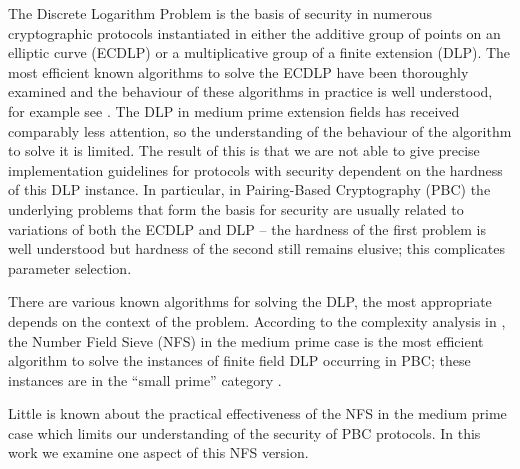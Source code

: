 \documentclass[a4paper, 10pt, envcountsect, runningheads]{article}
\numberwithin{figure}{section}
\numberwithin{equation}{section}
\begin{document}
The Discrete Logarithm Problem is the basis of security in numerous cryptographic protocols instantiated in either the additive group of points on an elliptic curve (ECDLP) or a multiplicative group of a finite extension (DLP). 
The most efficient known algorithms to solve the ECDLP have been thoroughly examined and the behaviour of these algorithms in practice is well understood, for example see \cite{pollard,teske,rho_chal_1,rho_chal_2,rho_efficiency}. The DLP in medium prime extension fields has received comparably less attention, so the understanding of the behaviour of the algorithm to solve it is limited. The result of this is that we are not able to give precise implementation guidelines for protocols with security dependent on the hardness of this DLP instance. In particular, in Pairing-Based Cryptography (PBC) the underlying problems that form the basis for security are usually related to variations of both the ECDLP and DLP -- the hardness of the first problem is well understood but hardness of the second still remains elusive; this complicates parameter selection.


There are various known algorithms for solving the DLP, the most appropriate depends on the context of the problem. According to the complexity analysis in \cite{joux-lercier-smart-vercauteren06}, the Number Field Sieve (NFS) in the medium prime case is the most efficient algorithm to solve the instances of finite field DLP occurring in PBC; these instances are in the ``small prime'' category \cite[Section 3.1]{joux-lercier-smart-vercauteren06}. 

Little is known about the practical effectiveness of the NFS in the medium prime case which limits our understanding of the security of PBC protocols. In this work we examine one aspect of this NFS version.



\end{document}
